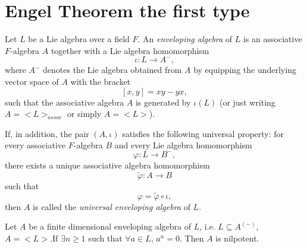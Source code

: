 \section{Engel Theorem the first type}

\begin{definition}
    Let \(L\) be a Lie algebra over a field \(F\). An \emph{enveloping algebra} of \(L\) is an associative \(F\)-algebra \(A\) together with a Lie algebra homomorphism
    \[
        \iota:L\to A^{-},
    \]
    where \(A^{-}\) denotes the Lie algebra obtained from \(A\) by equipping the underlying vector space of \(A\) with the bracket
    \[
        [x,y]=xy-yx,
    \]
    such that the associative algebra \(A\) is generated by \(\iota(L)\) (or just writing $A=<L>_{assoc}$ or simply $A=<L>$).

    If, in addition, the pair \((A,\iota)\) satisfies the following universal property: for every associative \(F\)-algebra \(B\) and every Lie algebra homomorphism
    \[
        \varphi:L\to B^{-},
    \]
    there exists a unique associative algebra homomorphism
    \[
        \widetilde{\varphi}:A\to B
    \]
    such that
    \[
        \varphi=\widetilde{\varphi}\circ \iota,
    \]
    then \(A\) is called the \emph{universal enveloping algebra} of \(L\).
\end{definition}

\begin{theorem}
    Let $ A $ be a finite dimensional enveloping algebra of $L$, i.e. $ L\subseteq A^{(-)} $, $ A = <L> $.If $ \exists n \ge 1 $ such that $ \forall a \in L $, $ a^n=0 $. Then $ A $ is nilpotent.
\end{theorem}

